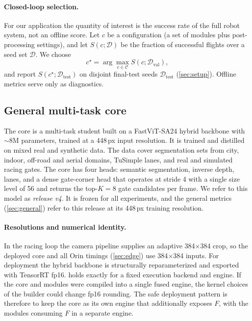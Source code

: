 \documentclass[10pt,twocolumn,letterpaper]{article}
\begin{document}
\paragraph{Closed-loop selection.}
For our application the quantity of interest is the success rate of the full robot system, not an offline score. Let $c$ be a configuration (a set of modules plus post-processing settings), and let $S(c; \mathcal{D})$ be the fraction of successful flights over a seed set $\mathcal{D}$. We choose
\begin{equation}
  c^\star = \arg\max_{c \in \mathcal{C}} S(c; \mathcal{D}_{\text{val}}),
  \label{eq:selection}
\end{equation}
and report $S(c^\star; \mathcal{D}_{\text{test}})$ on disjoint final-test seeds $\mathcal{D}_{\text{test}}$ (\cref{sec:setup}). Offline metrics serve only as diagnostics.

\subsection{General multi-task core}
\label{sec:core}
The core is a multi-task student built on a FastViT-SA24 hybrid backbone with $\sim$8M parameters, trained at a 448\,px input resolution. It is trained and distilled on mixed real and synthetic data. The data cover segmentation sets from city, indoor, off-road and aerial domains, TuSimple lanes, and real and simulated racing gates. The core has four heads: semantic segmentation, inverse depth, lanes, and a dense gate-corner head that operates at stride 4 with a single size level of 56 and returns the top-$K{=}8$ gate candidates per frame. We refer to this model as \emph{release v4}. It is frozen for all experiments, and the general metrics (\cref{sec:general}) refer to this release at its 448\,px training resolution.

\paragraph{Resolutions and numerical identity.}
In the racing loop the camera pipeline supplies an adaptive 384$\times$384 crop, so the deployed core and all Orin timings (\cref{sec:edge}) use 384$\times$384 inputs. For deployment the hybrid backbone is structurally reparameterized and exported with TensorRT fp16.  holds exactly for a fixed execution backend and engine. If the core and modules were compiled into a single fused engine, the kernel choices of the builder could change fp16 rounding. The safe deployment pattern is therefore to keep the core as its own engine that additionally exposes $F$, with the modules consuming $F$ in a separate engine.
\end{document}
